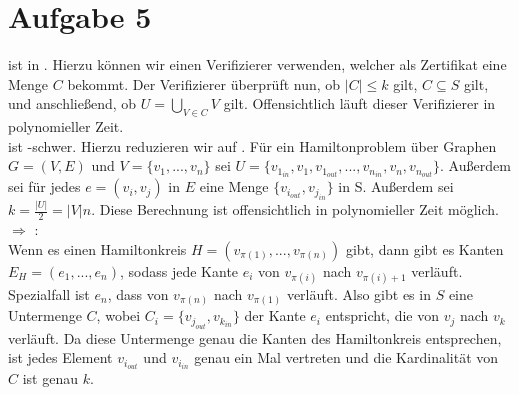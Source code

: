 \documentclass[a4paper,11pt]{scrartcl}
\begin{document}
\newpage

	\section*{Aufgabe 5}

	 ist in . Hierzu können wir einen Verifizierer verwenden, welcher als Zertifikat eine Menge $C$ bekommt. Der Verifizierer überprüft nun, ob $\vert C \vert \leq k$ gilt, $C \subseteq S$ gilt, und anschließend, ob $U = \bigcup_{V \in C} V$ gilt. Offensichtlich läuft dieser Verifizierer in polynomieller Zeit.\\
	
	 ist -schwer. Hierzu reduzieren wir  auf . Für ein Hamiltonproblem über Graphen $G=(V,E)$ und $V=\{v_1,...,v_n\}$ sei $U=\{v_{1_{in}},v_1,v_{1_{out}},...,v_{n_{in}},v_n,v_{n_{out}}\}$. Außerdem sei für jedes $e=(v_i,v_j)$ in $E$ eine Menge $\{v_{i_{out}},v_{j_{in}}\}$ in S. Außerdem sei $k= \frac{\vert U \vert}{2} = \vert V \vert n$. Diese Berechnung ist offensichtlich in polynomieller Zeit möglich.\\
	
	 $\Rightarrow$ :\\
	Wenn es einen Hamiltonkreis $H=(v_{\pi(1)},...,v_{\pi(n)})$ gibt, dann gibt es Kanten $E_H=(e_1,...,e_n)$, sodass jede Kante $e_i$ von $v_{\pi(i)}$ nach $v_{\pi(i)+1}$ verläuft. Spezialfall ist $e_n$, dass von $v_{\pi(n)}$ nach $v_{\pi(1)}$ verläuft. Also gibt es in $S$ eine Untermenge $C$, wobei $C_i=\{v_{j_{out}},v_{k_{in}}\}$ der Kante $e_i$ entspricht, die von $v_j$ nach $v_k$ verläuft. Da diese Untermenge genau die Kanten des Hamiltonkreis entsprechen, ist jedes Element $v_{i_{out}}$ und $v_{i_{in}}$ genau ein Mal vertreten und die Kardinalität von $C$ ist genau $k$.\\
	
\end{document}
